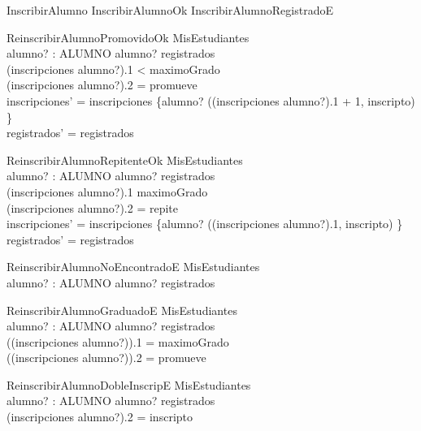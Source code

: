 \begin{zed}
    InscribirAlumno  InscribirAlumnoOk \lor InscribirAlumnoRegistradoE
\end{zed}

\begin{schema}{ReinscribirAlumnoPromovidoOk}
    \Delta MisEstudiantes \\
    alumno? : ALUMNO
    \where
    alumno? \in registrados \\
    (inscripciones alumno?).1 < maximoGrado \\ 
    (inscripciones alumno?).2 = promueve \\
    inscripciones' = inscripciones \oplus \{alumno? \mapsto ((inscripciones alumno?).1 + 1, inscripto) \} \\
    registrados' = registrados
\end{schema}

\begin{schema}{ReinscribirAlumnoRepitenteOk}
    \Delta MisEstudiantes \\
    alumno? : ALUMNO
    \where
    alumno? \in registrados \\
    (inscripciones alumno?).1 \leq maximoGrado \\ 
    (inscripciones alumno?).2 = repite \\
    inscripciones' = inscripciones \oplus \{alumno? \mapsto ((inscripciones alumno?).1, inscripto) \} \\
    registrados' = registrados
\end{schema}

\begin{schema}{ReinscribirAlumnoNoEncontradoE}
    \Xi MisEstudiantes \\
    alumno? : ALUMNO
    \where
    alumno? \notin registrados
\end{schema}

\begin{schema}{ReinscribirAlumnoGraduadoE}
    \Xi MisEstudiantes \\
    alumno? : ALUMNO
    \where
    alumno? \in registrados \\
    ((inscripciones alumno?)).1 = maximoGrado \\
    ((inscripciones alumno?)).2 = promueve 
\end{schema}

\begin{schema}{ReinscribirAlumnoDobleInscripE}
    \Xi MisEstudiantes \\
    alumno? : ALUMNO
    \where
    alumno? \in registrados \\
    (inscripciones alumno?).2 = inscripto
\end{schema}

